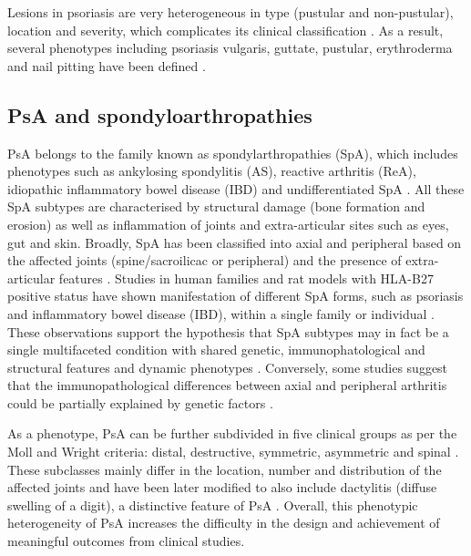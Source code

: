 Lesions in psoriasis are very heterogeneous in type (pustular and non-pustular), location and severity, which complicates its clinical classification \parencite{Perera2012}. As a result, several phenotypes including psoriasis vulgaris, guttate, pustular, erythroderma and nail pitting have been defined \parencite{Marrakchi2011}.



\subsection{PsA and spondyloarthropathies}
%
PsA belongs to the family known as spondylarthropathies (SpA), which includes phenotypes such as ankylosing spondylitis (AS), reactive arthritis (ReA), idiopathic inflammatory bowel disease (IBD) and undifferentiated SpA \parencite{Baeten2013}. All these SpA subtypes are characterised by structural damage (bone formation and erosion) as well as inflammation of joints and extra-articular sites such as eyes, gut and skin. Broadly, SpA has been classified into axial and peripheral based on the affected joints (spine/sacroilicac or peripheral) and the presence of extra-articular features \parencite{Runwaleit2001, Runwaleit2001}. Studies in human families and rat models with HLA-B27 positive status have shown manifestation of different SpA forms, such as psoriasis and inflammatory bowel disease (IBD), within a single family or individual \parencite{Hammer1990,Said-Nahal2000}. These observations support the hypothesis that SpA subtypes may in fact be a single multifaceted condition with shared genetic, immunophatological and structural features and dynamic phenotypes \parencite{Baeten2013}. Conversely, some studies suggest that the immunopathological differences between axial and peripheral arthritis could be partially explained by genetic factors \parencite{Porcher2005, Appel2011, Noordenbos2012}.

As a phenotype, PsA can be further subdivided in five clinical groups as per the Moll and Wright criteria: distal, destructive, symmetric, asymmetric and spinal \parencite{Moll1973}. These subclasses mainly differ in the location, number and distribution of the affected joints and have been later modified to also include dactylitis (diffuse swelling of a digit), a distinctive feature of PsA \parencite{Reich2009}. Overall, this phenotypic heterogeneity of PsA increases the difficulty in the design and achievement of meaningful outcomes from clinical studies.




